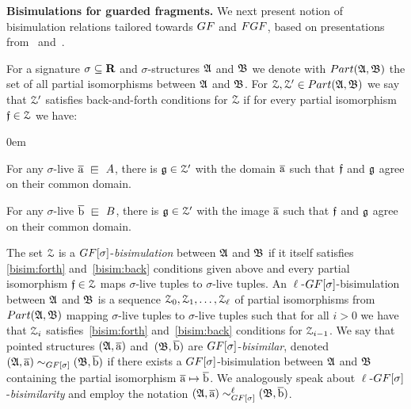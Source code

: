 \noindent \textbf{Bisimulations for guarded fragments.}
%
We next present notion of bisimulation relations tailored towards $\GF$ and $\FGF$, based on presentations from~\cite[Sec. 2.2.3]{Otto04} and~\cite[Sec. 2]{BednarczykJ22}.

For a signature $\sigma \subseteq \mathbf{R}$ and $\sigma$-structures ${\mathfrak{A}}$ and ${\mathfrak{B}}$ we denote with $\PartIso{\str{A}}{\str{B}}$ the set of all partial isomorphisms between ${\mathfrak{A}}$ and ${\mathfrak{B}}$. 
For $\bisimZ, \bisimZ' \in \PartIso{\str{A}}{\str{B}}$ we say that $\mathcal{Z}'$ satisfies back-and-forth conditions for $\mathcal{Z}$ if for every partial isomorphism $\mathfrak{f} \in \mathcal{Z}$ we have:
%
\begin{description}\itemsep0em
  \item[\desclabel{(Forth)}{bisim:forth}] For any $\sigma$-live $\elemtuplea \sqin A$, there is $\mathfrak{g} \in \mathcal{Z}'$ with the domain $\overline{\mathrm{a}}$ such that $\mathfrak{f}$ and $\mathfrak{g}$ agree on their common domain. 
  \item[\desclabel{(Back)}{bisim:back}] For any $\sigma$-live $\elemtupleb \sqin B$, there is $\mathfrak{g} \in \mathcal{Z}'$ with the image $\overline{\mathrm{a}}$ such that $\mathfrak{f}$ and $\mathfrak{g}$ agree on their common domain. 
\end{description}
The set $\mathcal{Z}$ is a $\GF[\sigma]$-\emph{bisimulation} between ${\mathfrak{A}}$ and ${\mathfrak{B}}$ if it itself satisfies \ref{bisim:forth} and~\ref{bisim:back} conditions given above and every partial isomorphism $\mathfrak{f} \in \mathcal{Z}$ maps $\sigma$-live tuples to $\sigma$-live tuples.
An $\ell$-$\GF[\sigma]$-bisimulation between ${\mathfrak{A}}$ and ${\mathfrak{B}}$ is a sequence $\mathcal{Z}_0, \mathcal{Z}_1, \ldots, \mathcal{Z}_\ell$ of partial isomorphisms from $\PartIso{\str{A}}{\str{B}}$ mapping $\sigma$-live tuples to $\sigma$-live tuples  such that for all $i > 0$ we have that $\mathcal{Z}_i$ satisfies~\ref{bisim:forth} and~\ref{bisim:back} conditions for $\mathcal{Z}_{i{-}1}$.
We say that pointed structures $({\mathfrak{A}}, \overline{\mathrm{a}})$ and~$({\mathfrak{B}}, \overline{\mathrm{b}})$ are $\GF[\sigma]$-\emph{bisimilar}, denoted $(\str{A}, \elemtuplea) \bisimto_{\GF[\sigma]} (\str{B}, \elemtupleb)$ if there exists a $\GF[\sigma]$-bisimulation  between ${\mathfrak{A}}$ and ${\mathfrak{B}}$ containing the partial isomorphism $\overline{\mathrm{a}} \mapsto \overline{\mathrm{b}}$.
We analogously speak about $\ell$-$\GF[\sigma]$-\emph{bisimilarity} and employ the notation $(\str{A}, \elemtuplea) \bisimto_{\GF[\sigma]}^{\ell} (\str{B}, \elemtupleb)$.

